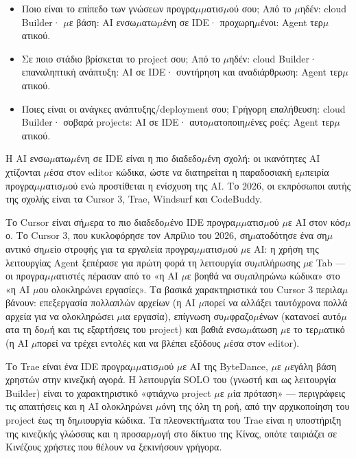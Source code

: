 \begin{itemize}
  \item Ποιο είναι το επίπεδο των γνώσεων προγρα$\mu$$\mu$ατισ$\mu$ού σου; Από το $\mu$ηδέν: cloud Builder· $\mu$ε βάση: AI ενσω$\mu$ατω$\mu$ένη σε IDE· προχωρη$\mu$ένοι: Agent τερ$\mu$ατικού.
  \item Σε ποιο στάδιο βρίσκεται το project σου; Από το $\mu$ηδέν: cloud Builder· επαναληπτική ανάπτυξη: AI σε IDE· συντήρηση και αναδιάρθρωση: Agent τερ$\mu$ατικού.
  \item Ποιες είναι οι ανάγκες ανάπτυξης/deployment σου; Γρήγορη επαλήθευση: cloud Builder· σοβαρά projects: AI σε IDE· αυτο$\mu$ατοποιη$\mu$ένες ροές: Agent τερ$\mu$ατικού.
\end{itemize}


Η AI ενσω$\mu$ατω$\mu$ένη σε IDE είναι η πιο διαδεδο$\mu$ένη σχολή: οι ικανότητες AI χτίζονται $\mu$έσα στον editor κώδικα, ώστε να διατηρείται η παραδοσιακή ε$\mu$πειρία προγρα$\mu$$\mu$ατισ$\mu$ού ενώ προστίθεται η ενίσχυση της AI. Το 2026, οι εκπρόσωποι αυτής της σχολής είναι τα Cursor 3, Trae, Windsurf και CodeBuddy.


Το Cursor είναι σή$\mu$ερα το πιο διαδεδο$\mu$ένο IDE προγρα$\mu$$\mu$ατισ$\mu$ού $\mu$ε AI στον κόσ$\mu$ο. Το Cursor 3, που κυκλοφόρησε τον Απρίλιο του 2026, ση$\mu$ατοδότησε ένα ση$\mu$αντικό ση$\mu$είο στροφής για τα εργαλεία προγρα$\mu$$\mu$ατισ$\mu$ού $\mu$ε AI: η χρήση της λειτουργίας Agent ξεπέρασε για πρώτη φορά τη λειτουργία συ$\mu$πλήρωσης $\mu$ε Tab — οι προγρα$\mu$$\mu$ατιστές πέρασαν από το «η AI $\mu$ε βοηθά να συ$\mu$πληρώνω κώδικα» στο «η AI $\mu$ου ολοκληρώνει εργασίες». Τα βασικά χαρακτηριστικά του Cursor 3 περιλα$\mu$βάνουν: επεξεργασία πολλαπλών αρχείων (η AI $\mu$πορεί να αλλάξει ταυτόχρονα πολλά αρχεία για να ολοκληρώσει $\mu$ια εργασία), επίγνωση συ$\mu$φραζο$\mu$ένων (κατανοεί αυτό$\mu$ατα τη δο$\mu$ή και τις εξαρτήσεις του project) και βαθιά ενσω$\mu$άτωση $\mu$ε το τερ$\mu$ατικό (η AI $\mu$πορεί να τρέχει εντολές και να βλέπει εξόδους $\mu$έσα στον editor).


Το Trae είναι ένα IDE προγρα$\mu$$\mu$ατισ$\mu$ού $\mu$ε AI της ByteDance, $\mu$ε $\mu$εγάλη βάση χρηστών στην κινεζική αγορά. Η λειτουργία SOLO του (γνωστή και ως λειτουργία Builder) είναι το χαρακτηριστικό «φτιάχνω project $\mu$ε $\mu$ία πρόταση» — περιγράφεις τις απαιτήσεις και η AI ολοκληρώνει $\mu$όνη της όλη τη ροή, από την αρχικοποίηση του project έως τη δη$\mu$ιουργία κώδικα. Τα πλεονεκτή$\mu$ατα του Trae είναι η υποστήριξη της κινεζικής γλώσσας και η προσαρ$\mu$ογή στο δίκτυο της Κίνας, οπότε ταιριάζει σε Κινέζους χρήστες που θέλουν να ξεκινήσουν γρήγορα.

